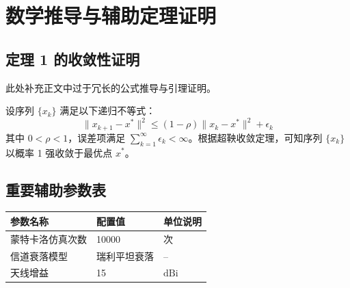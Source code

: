 
\appendix

\chapter{数学推导与辅助定理证明}

\section{定理 1 的收敛性证明}

此处补充正文中过于冗长的公式推导与引理证明。

设序列 $\{x_k\}$ 满足以下递归不等式：
\begin{equation}
  \|x_{k+1} - x^*\|^2 \le (1 - \rho)\|x_k - x^*\|^2 + \epsilon_k
  \label{eq:appendix_proof}
\end{equation}
其中 $0 < \rho < 1$，误差项满足 $\sum_{k=1}^\infty \epsilon_k < \infty$。根据超鞅收敛定理，可知序列 $\{x_k\}$ 以概率 1 强收敛于最优点 $x^*$。

\section{重要辅助参数表}

\begin{table}[htbp]
  \centering
  \label{tab:appendix_table}
  \renewcommand{\arraystretch}{1.3}
  \begin{tabular}{lll}
    \toprule
    参数名称 & 配置值 & 单位说明 \\
    \midrule
    蒙特卡洛仿真次数 & 10000 & 次 \\
    信道衰落模型 & 瑞利平坦衰落 & -- \\
    天线增益 & 15 & $\mathrm{dBi}$ \\
    \bottomrule
  \end{tabular}
\end{table}
